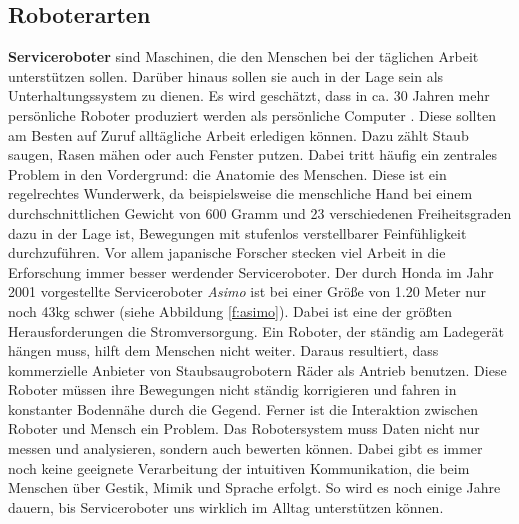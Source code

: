 \subsection{Roboterarten}
\textbf{Serviceroboter} sind Maschinen, die den Menschen bei der täglichen Arbeit unterstützen sollen. Darüber hinaus sollen sie auch in der Lage sein als Unterhaltungssystem zu dienen. Es wird geschätzt, dass in ca. 30 Jahren mehr persönliche Roboter produziert werden als persönliche Computer \cite{Haun2007}.
Diese sollten am Besten auf Zuruf alltägliche Arbeit erledigen können. Dazu zählt Staub saugen, Rasen mähen oder auch Fenster putzen. Dabei tritt häufig ein zentrales Problem in den Vordergrund: die Anatomie des Menschen. Diese ist ein regelrechtes Wunderwerk, da beispielsweise die menschliche Hand bei einem durchschnittlichen Gewicht von 600 Gramm und 23 verschiedenen Freiheitsgraden dazu in der Lage ist, Bewegungen mit stufenlos verstellbarer Feinfühligkeit durchzuführen. Vor allem japanische Forscher stecken viel Arbeit in die Erforschung immer besser werdender Serviceroboter. Der durch Honda im Jahr 2001 vorgestellte Serviceroboter \textit{Asimo} ist bei einer Größe von 1.20 Meter nur noch 43kg schwer (siehe Abbildung \ref{f:asimo}).
Dabei ist eine der größten Herausforderungen die Stromversorgung. Ein Roboter, der ständig am Ladegerät hängen muss, hilft dem Menschen nicht weiter. Daraus resultiert, dass kommerzielle Anbieter von Staubsaugrobotern Räder als Antrieb benutzen. Diese Roboter müssen ihre Bewegungen nicht ständig korrigieren und fahren in konstanter Bodennähe durch die Gegend. Ferner ist die Interaktion zwischen Roboter und Mensch ein Problem. Das Robotersystem muss Daten nicht nur messen und analysieren, sondern auch bewerten können. Dabei gibt es immer noch keine geeignete Verarbeitung der intuitiven Kommunikation, die beim Menschen über Gestik, Mimik und Sprache erfolgt. So wird es noch einige Jahre dauern, bis Serviceroboter uns wirklich im Alltag unterstützen können.
